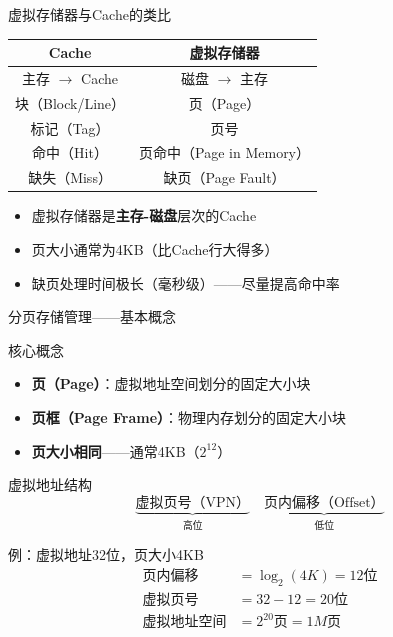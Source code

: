 \documentclass[10pt, aspectratio=169]{beamer}
\begin{document}
\begin{frame}{虚拟存储器与Cache的类比}
    \begin{center}
        \begin{tabular}{|c|c|}
            \hline
            \textbf{Cache} & \textbf{虚拟存储器} \\
            \hline
            主存 $\to$ Cache & 磁盘 $\to$ 主存 \\
            \hline
            块（Block/Line） & 页（Page） \\
            \hline
            标记（Tag） & 页号 \\
            \hline
            命中（Hit） & 页命中（Page in Memory） \\
            \hline
            缺失（Miss） & 缺页（Page Fault） \\
            \hline
        \end{tabular}
    \end{center}
    \vspace{0.5em}
    \begin{itemize}
        \item 虚拟存储器是\textbf{主存-磁盘}层次的Cache
        \item 页大小通常为4KB（比Cache行大得多）
        \item 缺页处理时间极长（毫秒级）——尽量提高命中率
    \end{itemize}
\end{frame}

\begin{frame}[t]{分页存储管理——基本概念}
    \begin{block}{核心概念}
        \begin{itemize}
            \item \textbf{页（Page）}：虚拟地址空间划分的固定大小块
            \item \textbf{页框（Page Frame）}：物理内存划分的固定大小块
            \item \textbf{页大小相同}——通常4KB（$2^{12}$）
        \end{itemize}
    \end{block}
    \vspace{0.3em}
    \begin{block}{虚拟地址结构}
        \[
            \underbrace{\text{虚拟页号（VPN）}}_{\text{高位}} \quad
            \underbrace{\text{页内偏移（Offset）}}_{\text{低位}}
        \]
    \end{block}
    \vspace{0.3em}
    \begin{exampleblock}{例：虚拟地址32位，页大小4KB}
        \begin{align*}
            \text{页内偏移} &= \log_2(4K) = 12\text{位} \\
            \text{虚拟页号} &= 32 - 12 = 20\text{位} \\
            \text{虚拟地址空间} &= 2^{20} \text{页} = 1M\text{页}
        \end{align*}
    \end{exampleblock}
\end{frame}
\end{document}
